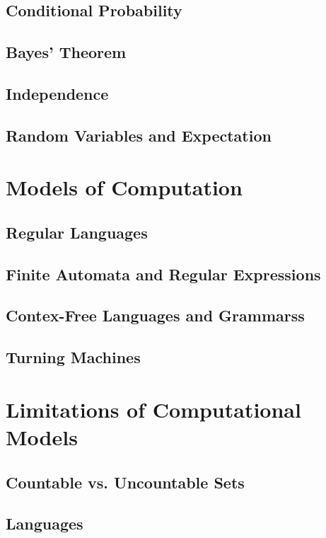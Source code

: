 \documentclass[a4paper]{article}
\begin{document}
\begin{multicols}{2}
	\subsection{Conditional Probability}
	\subsection{Bayes' Theorem}
	\subsection{Independence}
	\subsection{Random Variables and Expectation}

	\section{Models of Computation}
	\subsection{Regular Languages}
	\subsection{Finite Automata and Regular Expressions}
	\subsection{Contex-Free Languages and Grammarss}
	\subsection{Turning Machines}

	\section{Limitations of Computational Models}
	\subsection{Countable vs. Uncountable Sets}
	\subsection{Languages}


\end{multicols}
\end{document}
